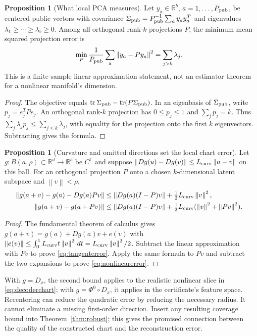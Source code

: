 \documentclass[11pt,a4paper]{article}
\theoremstyle{definition}
\newtheorem{proposition}[theorem]{Proposition}
\theoremstyle{definition}
\theoremstyle{remark}\newtheorem{remark}[theorem]{Remark}
\newcommand{\R}{\mathbb R}\newcommand{\Prob}{\mathbb P}\newcommand{\E}{\mathbb E}
\newcommand{\norm}[1]{\left\lVert #1\right\rVert}
\begin{document}
\begin{proposition}[What local PCA measures]\label{prop:pcatail}
Let $y_a\in\R^b$, $a=1,\ldots,P_{\rm pub}$, be centered public vectors with covariance
$\Sigma_{\rm pub}=P_{\rm pub}^{-1}\sum_a y_ay_a^T$ and eigenvalues
$\lambda_1\ge\cdots\ge\lambda_b\ge0$. Among all orthogonal rank-$k$ projections $P$, the minimum mean squared projection error is
\[
\min_P\frac1{P_{\rm pub}}\sum_a\norm{y_a-Py_a}^2
=\sum_{j>k}\lambda_j.
\]
This is a finite-sample linear approximation statement, not an estimator theorem for a nonlinear manifold's dimension.
\end{proposition}
\begin{proof}
The objective equals $\operatorname{tr}\Sigma_{\rm pub}-\operatorname{tr}(P\Sigma_{\rm pub})$. In an eigenbasis of $\Sigma_{\rm pub}$, write $p_j=e_j^TPe_j$. An orthogonal rank-$k$ projection has $0\le p_j\le1$ and $\sum_jp_j=k$. Thus $\sum_j\lambda_jp_j\le\sum_{j\le k}\lambda_j$, with equality for the projection onto the first $k$ eigenvectors. Subtracting gives the formula.
\end{proof}

\begin{proposition}[Curvature and omitted directions set the local chart error]\label{prop:curvature}
Let $g:B(a,\rho)\subset\R^d\to\R^b$ be $C^1$ and suppose
$\norm{Dg(u)-Dg(v)}\le L_{\rm curv}\norm{u-v}$ on this ball. For an orthogonal projection $P$ onto a chosen $k$-dimensional latent subspace and $\norm v<\rho$,
\begin{align}
\norm{g(a+v)-g(a)-Dg(a)Pv}
&\le\norm{Dg(a)(I-P)v}+\tfrac12L_{\rm curv}\norm v^2,\label{eq:tangenterror}\\
\norm{g(a+v)-g(a+Pv)}
&\le\norm{Dg(a)(I-P)v}
+\tfrac12L_{\rm curv}(\norm v^2+\norm{Pv}^2).\label{eq:nonlinearerror}
\end{align}
\end{proposition}
\begin{proof}
The fundamental theorem of calculus gives
$g(a+v)=g(a)+Dg(a)v+e(v)$ with
$\norm{e(v)}\le\int_0^1L_{\rm curv}t\norm v^2\,dt
=L_{\rm curv}\norm v^2/2$.
Subtract the linear approximation with $Pv$ to prove \eqref{eq:tangenterror}. Apply the same formula to $Pv$ and subtract the two expansions to prove \eqref{eq:nonlinearerror}.
\end{proof}

With $g=D_x$, the second bound applies to the realistic nonlinear slice in \eqref{eq:decoderchart}; with $g=\Phi^0\circ D_x$, it applies in the certificate's feature space. Recentering can reduce the quadratic error by reducing the necessary radius. It cannot eliminate a missing first-order direction. Insert any resulting coverage bound into Theorem~\ref{thm:robust}; this gives the promised connection between the quality of the constructed chart and the reconstruction error.
\end{document}
